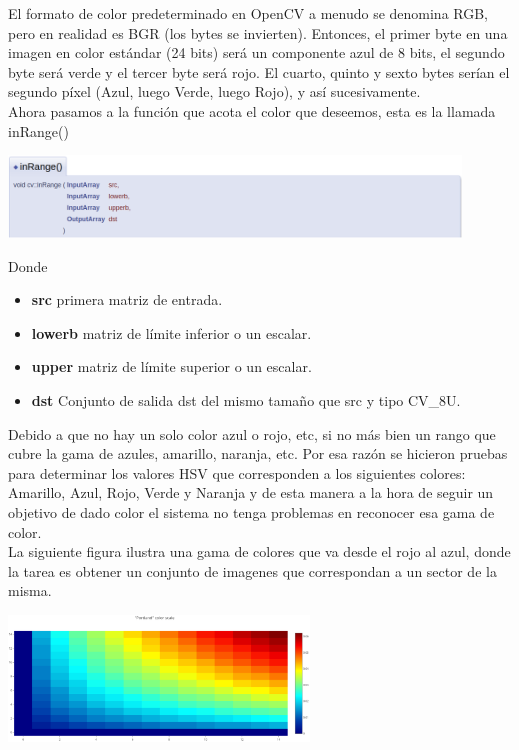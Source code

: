 El formato de color predeterminado en OpenCV a menudo se denomina RGB, pero en realidad
es BGR (los bytes se invierten). Entonces, el primer byte en una imagen en color estándar
(24 bits) será un componente azul de 8 bits, el segundo byte será verde y el tercer
byte será rojo. El cuarto, quinto y sexto bytes serían el segundo píxel (Azul, luego
Verde, luego Rojo), y así sucesivamente.\\
Ahora pasamos a la función que acota el color que deseemos, esta es la llamada inRange()
\begin{center}
	\includegraphics[width=0.9\textwidth]{Contenido/Cuerpo/Capitulo4/Fig3.eps}
	\label{Fig6}
\end{center}
Donde
\begin{itemize}
	\item \textbf{src} primera matriz de entrada.
	\item \textbf{lowerb} matriz de límite inferior o un escalar.
	\item \textbf{upper}  matriz de límite superior o un escalar.
	\item \textbf{dst} Conjunto de salida dst del mismo tamaño que src y tipo CV\_8U.
\end{itemize}
Debido a que no hay un solo color azul o rojo, etc, si no más bien un rango que cubre
la gama de azules, amarillo, naranja, etc. Por esa razón se hicieron pruebas para
determinar los valores HSV que corresponden a los siguientes colores: Amarillo, Azul,
Rojo, Verde y Naranja y de esta manera a la hora de seguir un objetivo de dado color
el sistema no tenga problemas en reconocer esa gama de color.\\
La siguiente figura ilustra una gama de colores que va desde el rojo al azul, donde la
tarea es obtener un conjunto de imagenes que correspondan a un sector de la misma.
\begin{center}
	\includegraphics[width=0.6\textwidth]{Contenido/Cuerpo/Capitulo4/Fig4.eps}
	\label{Fig6}
\end{center}
